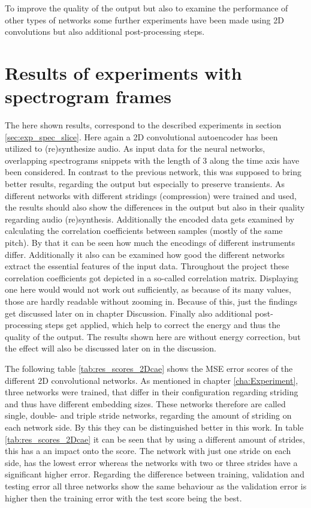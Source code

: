 To improve the quality of the output but also to examine the performance of other types of networks some further experiments have been made using 2D convolutions but also additional post-processing steps.

\section{Results of experiments with spectrogram frames}
The here shown results, correspond to the described experiments in section \ref{sec:exp_spec_slice}. Here again a 2D convolutional autoencoder has been utilized to (re)synthesize audio. As input data for the neural networks, overlapping spectrograms snippets with the length of 3 along the time axis have been considered. In contrast to the previous network, this was supposed to bring better results, regarding the output but especially to preserve transients. As different networks with different stridings (compression) were trained and used, the results should also show the differences in the output but also in their quality regarding audio (re)synthesis. Additionally the encoded data gets examined by calculating the correlation coefficients between samples (mostly of the same pitch). By that it can be seen how much the encodings of different instruments differ. Additionally it also can be examined how good the different networks extract the essential features of the input data. Throughout the project these correlation coefficients got depicted in a so-called correlation matrix. Displaying one here would would not work out sufficiently, as because of its many values, those are hardly readable without zooming in. Because of this, just the findings get discussed later on in chapter Discussion. Finally also additional post-processing steps get applied, which help to correct the energy and thus the quality of the output. The results shown here are without energy correction, but the effect will also be discussed later on in the discussion.

The following table \ref{tab:res_scores_2Dcae} shows the MSE error scores of the different 2D convolutional networks. As mentioned in chapter \ref{cha:Experiment}, three networks were trained, that differ in their configuration regarding striding and thus have different embedding sizes. These networks therefore are called single, double- and triple stride networks, regarding the amount of striding on each network side. By this they can be distinguished better in this work. In table \ref{tab:res_scores_2Dcae} it can be seen that by using a different amount of strides, this has a an impact onto the score. The network with just one stride on each side, has the lowest error whereas the networks with two or three strides have a significant higher error. Regarding the difference between training, validation and testing error all three networks show the same behaviour as the validation error is higher then the training error with the test score being the best. 

